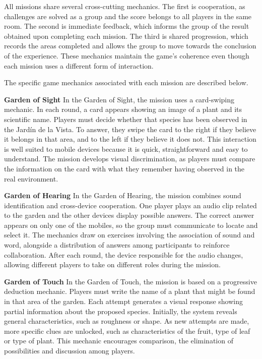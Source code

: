 All missions share several cross-cutting mechanics. The first is cooperation, as challenges are solved as a group and the score belongs to all players in the same room. The second is immediate feedback, which informs the group of the result obtained upon completing each mission. The third is shared progression, which records the areas completed and allows the group to move towards the conclusion of the experience. These mechanics maintain the game’s coherence even though each mission uses a different form of interaction.

The specific game mechanics associated with each mission are described below.

\textbf{Garden of Sight}
In the Garden of Sight, the mission uses a card-swiping mechanic. In each round, a card appears showing an image of a plant and its scientific name. Players must decide whether that species has been observed in the Jardín de la Vista. To answer, they swipe the card to the right if they believe it belongs in that area, and to the left if they believe it does not. This interaction is well suited to mobile devices because it is quick, straightforward and easy to understand. The mission develops visual discrimination, as players must compare the information on the card with what they remember having observed in the real environment.

\textbf{Garden of Hearing}
In the Garden of Hearing, the mission combines sound identification and cross-device cooperation. One player plays an audio clip related to the garden and the other devices display possible answers. The correct answer appears on only one of the mobiles, so the group must communicate to locate and select it. The mechanics draw on exercises involving the association of sound and word, alongside a distribution of answers among participants to reinforce collaboration. After each round, the device responsible for the audio changes, allowing different players to take on different roles during the mission.

\textbf{Garden of Touch}
In the Garden of Touch, the mission is based on a progressive deduction mechanic. Players must write the name of a plant that might be found in that area of the garden. Each attempt generates a visual response showing partial information about the proposed species. Initially, the system reveals general characteristics, such as roughness or shape. As new attempts are made, more specific clues are unlocked, such as characteristics of the fruit, type of leaf or type of plant. This mechanic encourages comparison, the elimination of possibilities and discussion among players.


